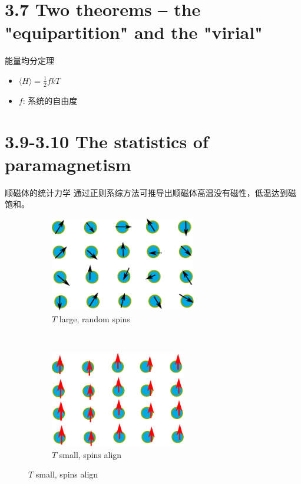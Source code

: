 \documentclass{ctexbeamer}
\begin{document}
\section{3.7 Two theorems -- the "equipartition" and the "virial"}
\begin{frame}{能量均分定理}
\begin{itemize}
    \item $\langle H \rangle = \frac{1}{2} fkT$
    \item $f$: 系统的自由度
\end{itemize}
\end{frame}
\section{3.9-3.10 The statistics of paramagnetism}
\begin{frame}{顺磁体的统计力学}
    通过正则系综方法可推导出顺磁体高温没有磁性，低温达到磁饱和。
    \begin{figure}
        \centering
        \begin{subfigure}{0.4\textwidth}
            \includegraphics[width=0.7\textwidth]{Tlarge.pdf}
            \caption{$T$ large, random spins}
        \end{subfigure}~
        \begin{subfigure}{0.4\textwidth}
            \includegraphics[width=0.65\textwidth]{Tsmall.pdf}
            \caption{$T$ small, spins align}
        \end{subfigure}
    \end{figure}
\end{frame}
\end{document}
